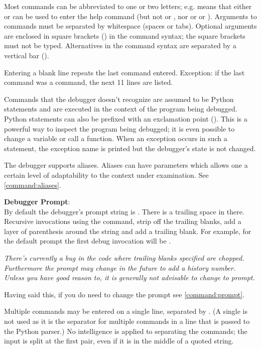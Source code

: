 Most commands can be abbreviated to one or two letters;
e.g.  means that either  or  can be
used to enter the help command (but not  or , nor
 or  or ).  Arguments to commands must
be separated by whitespace (spaces or tabs).  Optional arguments are
enclosed in square brackets (\samp{[]}) in the command syntax; the
square brackets must not be typed.  Alternatives in the command syntax
are separated by a vertical bar (\samp{|}).

Entering a blank line repeats the last command entered.  Exception: if
the last command was a  command, the next 11 lines are
listed.

Commands that the debugger doesn't recognize are assumed to be Python
statements and are executed in the context of the program being
debugged.  Python statements can also be prefixed with an exclamation
point (\samp{!}).  This is a powerful way to inspect the program being
debugged; it is even possible to change a variable or call a function.
When an exception occurs in such a statement, the exception name is
printed but the debugger's state is not changed.

The debugger supports aliases.  Aliases can have parameters which
allows one a certain level of adaptability to the context under
examination. See \ref{command:aliases}.

{\bf Debugger Prompt}:\label{debugger-prompt}\\
By default the debugger's prompt string is . There
is a trailing space in there. Recursive invocations using the
 command, strip off the trailing blanks, add a layer of
parenthesis around the string and add a trailing blank. For example,
for the default prompt the first debug invocation will be
.

\emph{There's currently a bug in the code where trailing blanks
specified are chopped. Furthermore the prompt may change in the future
to add a history number. Unless you have good reason to, it is
generally not advisable to change to prompt.}

Having said this, if you do need to change the prompt see
\ref{command:prompt}.


Multiple commands may be entered on a single line, separated by
\samp{;;}.  (A single \samp{;} is not used as it is
the separator for multiple commands in a line that is passed to
the Python parser.)
No intelligence is applied to separating the commands;
the input is split at the first \samp{;;} pair, even if it is in
the middle of a quoted string.

